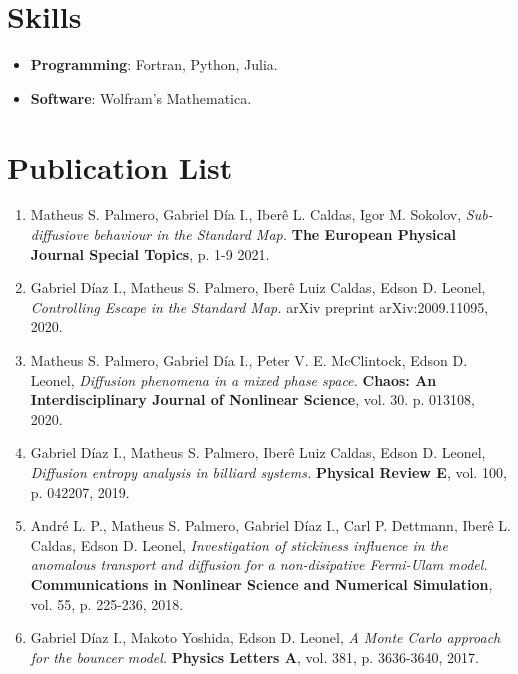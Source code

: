 \documentclass[margin,line]{resume}
\begin{document}
\begin{resume}
\section{\mysidestyle Skills}
\begin{itemize}
     \item {\bf Programming}: Fortran, Python, Julia.
     \item {\bf Software}: Wolfram's Mathematica.
\end{itemize}

    \section{\mysidestyle Publication List}
\begin{enumerate}

\item Matheus S. Palmero, Gabriel D\'ia I., Iber\^e L. Caldas, Igor M. Sokolov, {\it Sub-diffusiove behaviour in the Standard Map.} {\bf The European Physical Journal Special Topics}, p. 1-9 2021.

\item Gabriel D\'iaz I., Matheus S. Palmero, Iber\^e Luiz Caldas, Edson D. Leonel, {\it Controlling Escape in the Standard Map.} arXiv preprint arXiv:2009.11095, 2020.

\item Matheus S. Palmero, Gabriel D\'ia I., Peter V. E. McClintock, Edson D. Leonel, {\it Diffusion phenomena in a mixed phase space.} {\bf Chaos: An Interdisciplinary Journal of Nonlinear Science}, vol. 30. p. 013108, 2020.

\item Gabriel D\'iaz I., Matheus S. Palmero, Iber\^e Luiz Caldas, Edson D. Leonel, {\it Diffusion entropy analysis in billiard systems.} {\bf Physical Review E}, vol. 100, p. 042207, 2019.

\item Andr\'e L. P., Matheus S. Palmero, Gabriel D\'iaz I., Carl P. Dettmann, Iber\^e L. Caldas, Edson D. Leonel, {\it Investigation of stickiness influence in the anomalous transport and diffusion for a non-disipative Fermi-Ulam model.} {\bf Communications in Nonlinear Science and Numerical Simulation}, vol. 55, p. 225-236, 2018.

\item Gabriel D\'iaz I., Makoto Yoshida, Edson D. Leonel, {\it A Monte Carlo approach for the bouncer model.} {\bf Physics Letters A}, vol. 381, p. 3636-3640, 2017.


\end{enumerate}
\end{resume}
\end{document}
